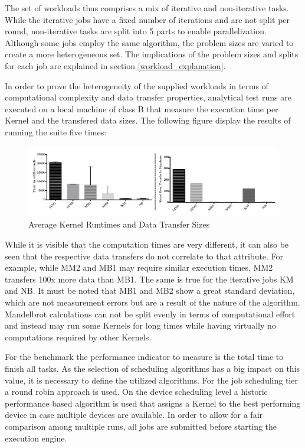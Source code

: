 The set of workloads thus comprises a mix of iterative and non-iterative tasks. While the iterative jobs have a fixed number of iterations and are not split per round, non-iterative tasks are split into 5 parts to enable parallelization. Although some jobs employ the same algorithm, the problem sizes are varied to create a more heterogeneous set. The implications of the problem sizes and splits for each job are explained in section \ref{workload_explanation}.

In order to prove the heterogeneity of the supplied workloads in terms of computational complexity and data transfer properties, analytical test runs are executed on a local machine of class B that measure the execution time per Kernel and the transfered data sizes. The following figure display the results of running the suite five times:

\begin{figure}[H]
	
	\includegraphics[width=1.0\textwidth]{images/benchmark_kernel_data_transfers.pdf}
	\centering
	\caption{Average Kernel Runtimes and Data Transfer Sizes}
	\label{img:benchmark_kernel_attributes}
\end{figure}

While it is visible that the computation times are very different, it can also be seen that the respective data transfers do not correlate to that attribute. For example, while MM2 and MB1 may require similar execution times, MM2 transfers 100x more data than MB1. The same is true for the iterative jobs KM and NB. It must be noted that MB1 and MB2 show a great standard deviation, which are not measurement errors but are a result of the nature of the algorithm. Mandelbrot calculations can not be split evenly in terms of computational effort and instead may run some Kernels for long times while having virtually no computations required by other Kernels.

For the benchmark the performance indicator to measure is the total time to finish all tasks. As the selection of scheduling algorithms has a big impact on this value, it is necessary to define the utilized algorithms. For the job scheduling tier a round robin approach is used. On the device scheduling level a historic performance based algorithm is used that assigns a Kernel to the best performing device in case multiple devices are available. In order to allow for a fair comparison among multiple runs, all jobs are submitted before starting the execution engine.

